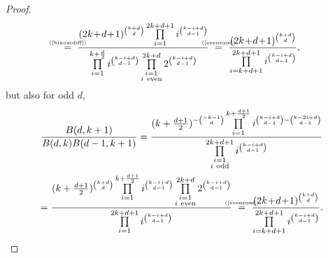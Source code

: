 \documentclass{amsart}
\newcommand{\myeq}[1]{\mathrel{\overset{\makebox[0pt]{\text{\tiny #1}}}{=}}}
\theoremstyle{plain}
\theoremstyle{definition}
\theoremstyle{remark}
\begin{document}
\begin{proof}
\begin{gather*}
\myeq{(\ref{binomdiff})}\ \frac{ (2k\!+\!d\!+\!1)^{\binom{k+d}{d}}  \prod\limits_{i=1}^{2k+d+1}i^{\binom{k-i+d}{d-1}}  }{ \prod\limits_{i=1}^{k+\frac{d}{2}} i^{\binom{k-i+d}{d-1}} \prod\limits_{\substack{i=1 \\ i\ \text{even} }}^{2k+d} 2^{ \binom{k-i+d}{d-1}} } 
\ \myeq{(\ref{evensum})} \ \frac{ (2k\!+\!d\!+\!1)^{\binom{k+d}{d}} }{ \prod\limits_{i=k+d+1}^{2k+d+1}i^{ \binom{k-i+d}{d-1}} },
\end{gather*}
but also for odd $d$,
\begin{gather*}
\frac{B(d,k+1)}{B(d,k)B(d-1,k+1)} = \frac{ (k+\tfrac{d+1}{2})^{-\binom{-k-1}{d}} \prod\limits_{i=1}^{k+\frac{d+1}{2}} i^{\binom{k-i+d}{d-1}-\binom{k-2i+d}{d-1}}  }{ \prod\limits_{\substack{i=1 \\ i\ \text{odd} }}^{2k+d+1}i^{\binom{k-i+d}{d-1}} } \\
= \frac{ (k+\tfrac{d+1}{2})^{\binom{k+d}{d}} \prod\limits_{i=1}^{k+\frac{d+1}{2}} i^{\binom{k-i+d}{d-1}}  \prod\limits_{\substack{i=1 \\ i\ \text{even} }}^{2k+d} 2^{ \binom{k-i+d}{d-1}}}{ \prod\limits_{i=1}^{2k+d+1}i^{\binom{k-i+d}{d-1}}} 
\ \myeq{(\ref{evensum})} \ \frac{ (2k\!+\!d\!+\!1)^{\binom{k+d}{d}} }{ \prod\limits_{i=k+d+1}^{2k+d+1}i^{ \binom{k-i+d}{d-1}} }.
\end{gather*}
\end{proof}
\end{document}
